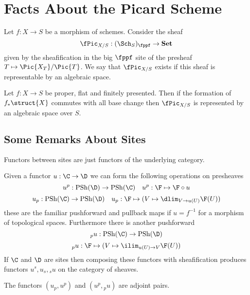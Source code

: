 \documentclass[12pt]{article}
\begin{document}
\section{Facts About the Picard Scheme}

\newcommand{\Set}{\mathbf{Set}}

\begin{defn}
Let $f : X \to S$ be a morphism of schemes. Consider the sheaf
\[ \fPic_{X/S} : (\Sch_S)_{\fppf} \to \Set \]
given by the sheafification in the big $\fppf$ site of the presheaf $T \mapsto \Pic{X_T} / \Pic{T}$. We say that $\fPic_{X/S}$ exists if this sheaf is representable by an algebraic space. 
\end{defn}

\begin{theorem}[Artin]
Let $f : X \to S$ be proper, flat and finitely presented. Then if the formation of $f_* \struct{X}$ commutes with all base change then $\fPic_{X/S}$ is represented by an algebraic space over $S$.
\end{theorem}

\subsection{Some Remarks About Sites}

\renewcommand{\Sh}{\mathrm{Sh}}
\newcommand{\PSh}{\mathrm{PSh}}

Functors between sites are just functors of the underlying category.

\begin{defn}
Given a functor $u : \C \to \D$ we can form the following operations on presheaves
\[ u^p : \PSh(\D) \to \PSh(\C) \quad u^p : \F \mapsto \F \circ u \]
\[ u_p : \PSh(\C) \to \PSh(\D) \quad u_p : \F \mapsto (V \mapsto \dlim_{V \to u(U)} \F(U)) \]
these are the familiar pushforward and pullback maps if $u = f^{-1}$ for a morphism of topological spaces. Furthermore there is another pushforward
\[ {}_p u : \PSh(\C) \to \PSh(\D) \]
\[ {}_p u : \F \mapsto (V \mapsto \ilim_{u(U) \to V} \F(U)) \]
If $\C$ and $\D$ are sites then composing these functors with sheafification produces functors $u^s, u_s, {}_s u$ on the category of sheaves.
\end{defn}

\begin{lemma}
The functors $(u_p, u^p)$ and $(u^p, {}_p u)$ are adjoint pairs.
\end{lemma}
\end{document}
